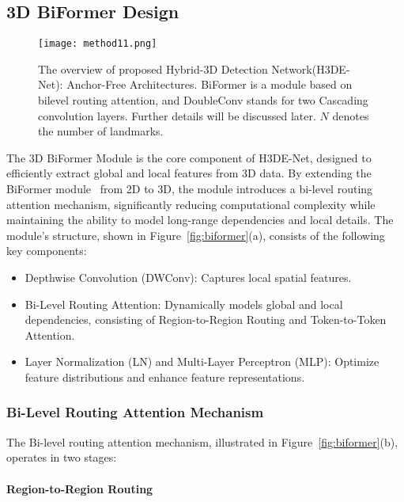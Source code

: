 \subsection{3D BiFormer Design}

\begin{figure}[htbp]
\centering
\texttt{[image: method11.png]}
\caption{The overview of proposed Hybrid-3D Detection Network(H3DE-Net): Anchor-Free Architectures. BiFormer is a module based on bilevel routing attention, and DoubleConv stands for two Cascading convolution layers. Further details will be discussed later. $N$ denotes the number of landmarks.}
\label{fig:network1}
\end{figure}

The 3D BiFormer Module is the core component of H3DE-Net, designed to efficiently extract global and local features from 3D data. By extending the BiFormer module~\cite{biformer} from 2D to 3D, the module introduces a bi-level routing attention mechanism, significantly reducing computational complexity while maintaining the ability to model long-range dependencies and local details. The module's structure, shown in Figure~\ref{fig:biformer}(a), consists of the following key components:

\begin{itemize}
    \item Depthwise Convolution (DWConv): Captures local spatial features.
    \item Bi-Level Routing Attention: Dynamically models global and local dependencies, consisting of Region-to-Region Routing and Token-to-Token Attention.
    \item Layer Normalization (LN) and Multi-Layer Perceptron (MLP): Optimize feature distributions and enhance feature representations.
\end{itemize}



\subsubsection{Bi-Level Routing Attention Mechanism}

The Bi-level routing attention mechanism, illustrated in Figure~\ref{fig:biformer}(b), operates in two stages:

\paragraph{Region-to-Region Routing}

